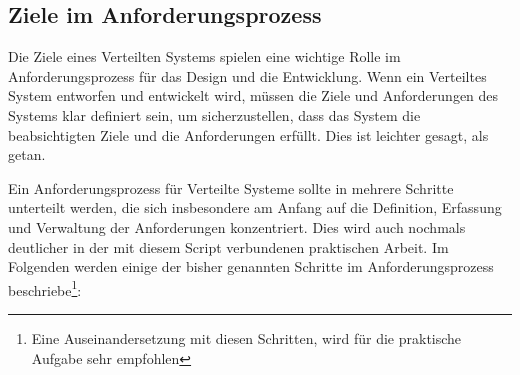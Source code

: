 \subsection{Ziele im Anforderungsprozess}
Die Ziele eines Verteilten Systems spielen eine wichtige Rolle im Anforderungsprozess für das Design und die Entwicklung. Wenn ein Verteiltes System entworfen und entwickelt wird, müssen die Ziele und Anforderungen des Systems klar definiert sein, um sicherzustellen, dass das System die beabsichtigten Ziele und die Anforderungen erfüllt. Dies ist leichter gesagt, als getan.

Ein Anforderungsprozess für Verteilte Systeme sollte in mehrere Schritte unterteilt werden, die sich insbesondere am Anfang auf die Definition, Erfassung und Verwaltung der Anforderungen konzentriert. Dies wird auch nochmals deutlicher in der mit diesem Script verbundenen praktischen Arbeit. Im Folgenden werden einige der bisher genannten Schritte im Anforderungsprozess beschriebe\footnote{Eine Auseinandersetzung mit diesen Schritten, wird für die praktische Aufgabe sehr empfohlen}:
